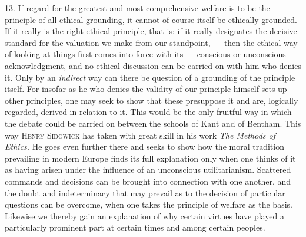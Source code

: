 \documentclass[12pt,a4paper,openany]{book}
\begin{document}
13. If regard for the greatest and most comprehensive welfare is to be the principle of all ethical
grounding, it cannot of course itself be ethically grounded. If it really is the right ethical
principle, that is: if it really designates the decisive standard for the valuation we make from our
standpoint, --- then the ethical way of looking at things first comes into force with its ---
conscious or unconscious --- acknowledgment, and no ethical discussion can be carried on with him who
denies it. Only by an \textit{indirect} way can there be question of a grounding of the principle
itself. For insofar as he who denies the validity of our principle himself sets up other principles,
one may seek to show that these presuppose it and are, logically regarded, derived in relation to
it. This would be the only fruitful way in which the debate could be carried on between the schools
of Kant and of Bentham. This way \textsc{Henry Sidgwick} has taken with great skill in his work
\textit{The Methods of Ethics.} He goes even further there and seeks to show how the moral tradition
prevailing in modern Europe finds its full explanation only when one thinks of it as having arisen
under the influence of an unconscious utilitarianism. Scattered commands and decisions can be brought
into connection with one another, and the doubt and indeterminacy that may prevail as to the decision
of particular questions can be overcome, when one takes the principle of welfare as the basis.
Likewise we thereby gain an explanation of why certain virtues have played a particularly prominent
part at certain times and among certain peoples.
\end{document}
